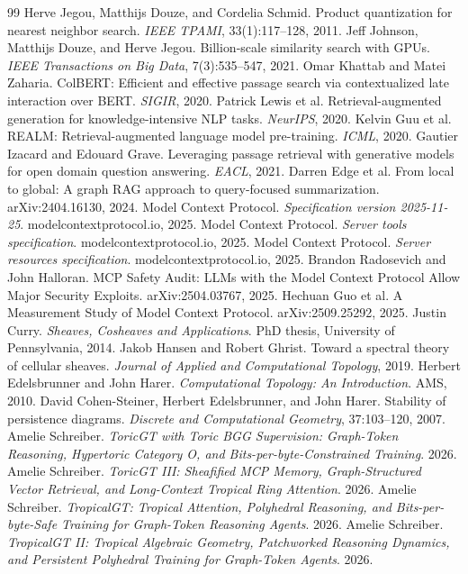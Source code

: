 \documentclass[11pt]{article}
\theoremstyle{definition}
\theoremstyle{remark}
\begin{document}
\begin{thebibliography}{99}
 Herve Jegou, Matthijs Douze, and Cordelia Schmid. Product quantization for nearest neighbor search. \emph{IEEE TPAMI}, 33(1):117--128, 2011.
 Jeff Johnson, Matthijs Douze, and Herve Jegou. Billion-scale similarity search with GPUs. \emph{IEEE Transactions on Big Data}, 7(3):535--547, 2021.
 Omar Khattab and Matei Zaharia. ColBERT: Efficient and effective passage search via contextualized late interaction over BERT. \emph{SIGIR}, 2020.
 Patrick Lewis et al. Retrieval-augmented generation for knowledge-intensive NLP tasks. \emph{NeurIPS}, 2020.
 Kelvin Guu et al. REALM: Retrieval-augmented language model pre-training. \emph{ICML}, 2020.
 Gautier Izacard and Edouard Grave. Leveraging passage retrieval with generative models for open domain question answering. \emph{EACL}, 2021.
 Darren Edge et al. From local to global: A graph RAG approach to query-focused summarization. arXiv:2404.16130, 2024.
 Model Context Protocol. \emph{Specification version 2025-11-25}. modelcontextprotocol.io, 2025.
 Model Context Protocol. \emph{Server tools specification}. modelcontextprotocol.io, 2025.
 Model Context Protocol. \emph{Server resources specification}. modelcontextprotocol.io, 2025.
 Brandon Radosevich and John Halloran. MCP Safety Audit: LLMs with the Model Context Protocol Allow Major Security Exploits. arXiv:2504.03767, 2025.
 Hechuan Guo et al. A Measurement Study of Model Context Protocol. arXiv:2509.25292, 2025.
 Justin Curry. \emph{Sheaves, Cosheaves and Applications}. PhD thesis, University of Pennsylvania, 2014.
 Jakob Hansen and Robert Ghrist. Toward a spectral theory of cellular sheaves. \emph{Journal of Applied and Computational Topology}, 2019.
 Herbert Edelsbrunner and John Harer. \emph{Computational Topology: An Introduction}. AMS, 2010.
 David Cohen-Steiner, Herbert Edelsbrunner, and John Harer. Stability of persistence diagrams. \emph{Discrete and Computational Geometry}, 37:103--120, 2007.
 Amelie Schreiber. \emph{ToricGT with Toric BGG Supervision: Graph-Token Reasoning, Hypertoric Category O, and Bits-per-byte-Constrained Training}. 2026.
 Amelie Schreiber. \emph{ToricGT III: Sheafified MCP Memory, Graph-Structured Vector Retrieval, and Long-Context Tropical Ring Attention}. 2026.
 Amelie Schreiber. \emph{TropicalGT: Tropical Attention, Polyhedral Reasoning, and Bits-per-byte-Safe Training for Graph-Token Reasoning Agents}. 2026.
 Amelie Schreiber. \emph{TropicalGT II: Tropical Algebraic Geometry, Patchworked Reasoning Dynamics, and Persistent Polyhedral Training for Graph-Token Agents}. 2026.
\end{thebibliography}
\end{document}
